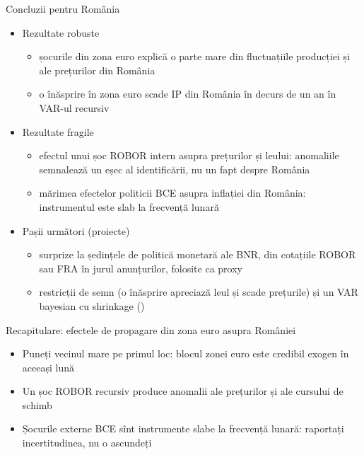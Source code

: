 \begin{frame}{Concluzii pentru România}
\itemsize{\small}
\begin{itemize}
    \item Rezultate robuste
    \begin{itemize}
        \item șocurile din zona euro explică o parte mare din fluctuațiile producției și ale prețurilor din România
        \item o înăsprire în zona euro scade IP din România în decurs de un an în VAR-ul recursiv
    \end{itemize}
    \item Rezultate fragile
    \begin{itemize}
        \item efectul unui șoc ROBOR intern asupra prețurilor și leului: anomaliile semnalează un eșec al identificării, nu un fapt despre România
        \item mărimea efectelor politicii BCE asupra inflației din România: instrumentul este slab la frecvență lunară
    \end{itemize}
    \item Pașii următori (proiecte)
    \begin{itemize}
        \item surprize la ședințele de politică monetară ale BNR, din cotațiile ROBOR sau FRA în jurul anunțurilor, folosite ca proxy
        \item restricții de semn (o înăsprire apreciază leul și scade prețurile) și un VAR bayesian cu shrinkage ()
    \end{itemize}
\end{itemize}
\end{frame}

\begin{frame}{Recapitulare: efectele de propagare din zona euro asupra României}
\itemsize{\small}
\begin{itemize}
    \item Puneți vecinul mare pe primul loc: blocul zonei euro este credibil exogen în aceeași lună
    \item Un șoc ROBOR recursiv produce anomalii ale prețurilor și ale cursului de schimb
    \item Șocurile externe BCE sînt instrumente slabe la frecvență lunară: raportați incertitudinea, nu o ascundeți
\end{itemize}
\end{frame}



